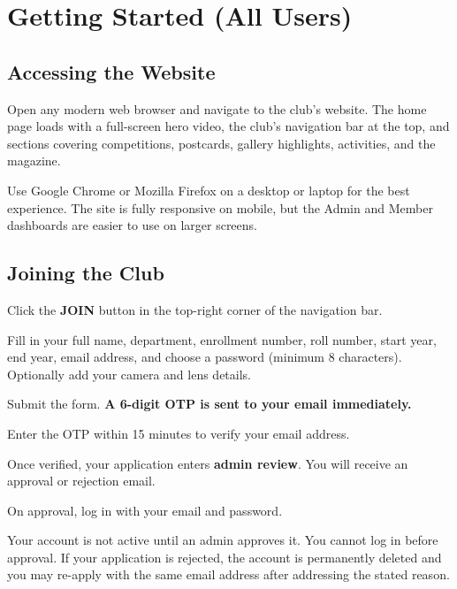\documentclass[12pt,a4paper]{article}
\begin{document}
\section{Getting Started (All Users)}

\subsection{Accessing the Website}

Open any modern web browser and navigate to the club's website. The home page loads with a full-screen hero video, the club's navigation bar at the top, and sections covering competitions, postcards, gallery highlights, activities, and the magazine.

\begin{tipbox}
Use Google Chrome or Mozilla Firefox on a desktop or laptop for the best experience. The site is fully responsive on mobile, but the Admin and Member dashboards are easier to use on larger screens.
\end{tipbox}

\subsection{Joining the Club}

\begin{steps}
\item Click the \textbf{JOIN} button in the top-right corner of the navigation bar.
\item Fill in your full name, department, enrollment number, roll number, start year, end year, email address, and choose a password (minimum 8 characters). Optionally add your camera and lens details.
\item Submit the form. \textbf{A 6-digit OTP is sent to your email immediately.}
\item Enter the OTP within 15 minutes to verify your email address.
\item Once verified, your application enters \textbf{admin review}. You will receive an approval or rejection email.
\item On approval, log in with your email and password.
\end{steps}

\begin{warnbox}
Your account is not active until an admin approves it. You cannot log in before approval. If your application is rejected, the account is permanently deleted and you may re-apply with the same email address after addressing the stated reason.
\end{warnbox}
\end{document}
